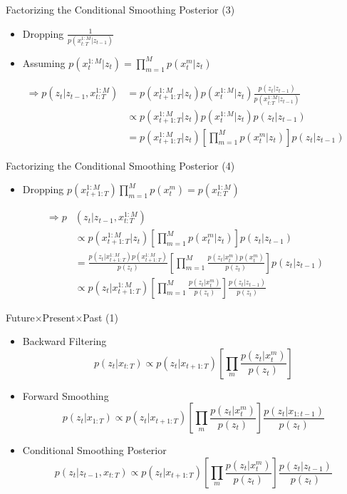 \documentclass{beamer}
\begin{document}
\begin{frame}{Factorizing the Conditional Smoothing Posterior (3)}
\begin{itemize}
\item Dropping $\frac{1}{p(x_{t:T}^{1:M}|z_{t-1})}$
\item Assuming $p(x_t^{1:M}|z_t)=\prod_{m=1}^M p(x_t^m|z_t)$
\end{itemize}
\[
\begin{split}
\Rightarrow p(z_t|z_{t-1},x_{t:T}^{1:M})&=p(x_{t+1:T}^{1:M}|z_t)p(x_t^{1:M}|z_t)\frac{p(z_t|z_{t-1})}{p(x_{t:T}^{1:M}|z_{t-1})}\\
&\propto p(x_{t+1:T}^{1:M}|z_t)p(x_t^{1:M}|z_t)p(z_t|z_{t-1})\\
&= p(x_{t+1:T}^{1:M}|z_t)\left[
\prod_{m=1}^M p(x_t^m|z_t)
\right]
p(z_t|z_{t-1})
\end{split}
\]
\end{frame}

\begin{frame}{Factorizing the Conditional Smoothing Posterior (4)}
\begin{itemize}
\item Dropping $p(x_{t+1:T}^{1:M})\prod_{m=1}^M p(x_t^m)=p(x_{t:T}^{1:M})$
\end{itemize}
\[
\begin{split}
\Rightarrow p&(z_t|z_{t-1},x_{t:T}^{1:M})\\
&\propto p(x_{t+1:T}^{1:M}|z_t)\left[
\prod_{m=1}^M p(x_t^m|z_t)
\right]
p(z_t|z_{t-1})\\
&=\frac{p(z_t|x_{t+1:T}^{1:M})p(x_{t+1:T}^{1:M})}{p(z_t)}\left[
\prod_{m=1}^M \frac{p(z_t|x_t^m)p(x_t^m)}{p(z_t)}
\right]
p(z_t|z_{t-1})\\
&\propto
p(z_t|x_{t+1:T}^{1:M})\left[
\prod_{m=1}^M \frac{p(z_t|x_t^m)}{p(z_t)}
\right]
\frac{p(z_t|z_{t-1})}{p(z_t)}
\end{split}
\]
\end{frame}

\begin{frame}{Future$\times$Present$\times$Past (1)}
\begin{itemize}
\item Backward Filtering\[
p(z_t|x_{t:T})\propto p(z_t|x_{t+1:T})\left[\prod_m\frac{p(z_t|x_t^m)}{p(z_t)}\right]
\]
\item Forward Smoothing\[
p(z_t|x_{1:T})\propto p(z_t|x_{t+1:T})\left[\prod_m\frac{p(z_t|x_t^m)}{p(z_t)}\right]\frac{p(z_t|x_{1:t-1})}{p(z_t)}
\]
\item Conditional Smoothing Posterior\[
p(z_t|z_{t-1},x_{t:T})\propto p(z_t|x_{t+1:T})\left[\prod_m \frac{p(z_t|x_t^m)}{p(z_t)}\right]\frac{p(z_t|z_{t-1})}{p(z_t)}
\]
\end{itemize}
\end{frame}
\end{document}
